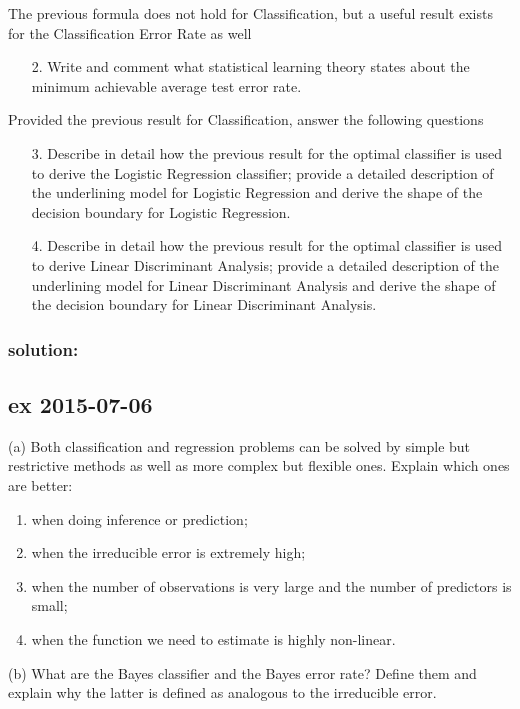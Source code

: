\documentclass[a4paper,12pt,titlepage]{article} %
\begin{document}
The previous formula does not hold for Classification, but a useful result exists for the Classification Error Rate as well

\begin{itemize}
\item[2.] Write and comment what statistical learning theory states about the minimum achievable average test error rate.
\end{itemize}

Provided the previous result for Classification, answer the following questions

\begin{itemize}
\item[3.] Describe in detail how the previous result for the optimal classifier is used to derive the Logistic Regression classifier; provide a detailed description of the underlining model for Logistic Regression and derive the shape of the decision boundary for Logistic Regression.
\item[4.] Describe in detail how the previous result for the optimal classifier is used to derive Linear Discriminant Analysis; provide a detailed description of the underlining model for Linear Discriminant Analysis and derive the shape of the decision boundary for Linear Discriminant Analysis.
\end{itemize}

\subsubsection{solution:}


\newpage
\subsection{ex 2015-07-06}
(a) Both classification and regression problems can be solved by simple but restrictive methods as well as more complex but flexible ones. Explain which ones are better:
\begin{enumerate}
\item when doing inference or prediction;
\item when the irreducible error is extremely high;
\item when the number of observations is very large and the number of predictors is small;
\item when the function we need to estimate is highly non-linear.
\end{enumerate}
(b) What are the Bayes classifier and the Bayes error rate? Define them and explain why the latter is defined as analogous to the irreducible error.
\end{document}
